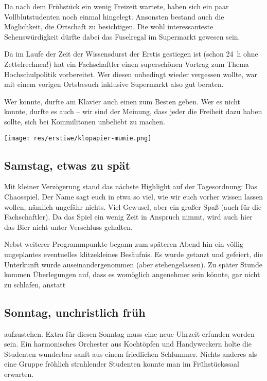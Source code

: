 \begin{multicols*}{2}
Da nach dem Frühstück ein wenig Freizeit wartete, haben sich ein paar Vollblutstudenten noch einmal hingelegt.
Ansonsten bestand auch die Möglichkeit, die Ortschaft zu besichtigen.
Die wohl interessanteste Sehenswürdigkeit dürfte dabei das Fuselregal im Supermarkt gewesen sein.

Da im Laufe der Zeit der Wissensdurst der Erstis gestiegen ist (schon \SI{24}{\hour} ohne Zettelrechnen!) hat ein Fachschaftler einen superschönen Vortrag zum Thema Hochschulpolitik vorbereitet.
Wer diesen unbedingt wieder vergessen wollte, war mit einem vorigen Ortsbesuch inklusive Supermarkt also gut beraten.

Wer konnte, durfte am Klavier auch einen zum Besten geben.
Wer es nicht konnte, durfte es auch -- wir sind der Meinung, dass jeder die Freiheit dazu haben sollte, sich bei Kommilitonen unbeliebt zu machen.

\begin{center}
	\texttt{[image: res/erstiwe/klopapier-mumie.png]}
\end{center}

\subsection{Samstag, etwas zu spät}
Mit kleiner Verzögerung stand das nächste Highlight auf der Tagesordnung:
Das Chaosspiel.
Der Name sagt euch in etwa so viel, wie wir euch vorher wissen lassen wollen, nämlich ungefähr nichts.
Viel Gewusel, aber ein großer Spaß (auch für die Fachschaftler).
Da das Spiel ein wenig Zeit in Anspruch nimmt, wird auch hier das Bier nicht unter Verschluss gehalten.

Nebst weiterer Programmpunkte begann zum späteren Abend hin ein völlig ungeplantes eventuelles klitzekleines Besäufnis.
Es wurde getanzt und gefeiert, die Unterkunft wurde auseinandergenommen (aber stehengelassen).
Zu später Stunde kommen Überlegungen auf, dass es womöglich angenehmer sein könnte, gar nicht zu schlafen, anstatt 

\subsection{Sonntag, unchristlich früh}
aufzustehen.
Extra für diesen Sonntag muss eine neue Uhrzeit erfunden worden sein.
Ein harmonisches Orchester aus Kochtöpfen und Handyweckern holte die Studenten wunderbar sanft aus einem friedlichen Schlummer.
Nichts anderes als eine Gruppe fröhlich strahlender Studenten konnte man im Frühstückssaal erwarten.


\end{multicols*}
